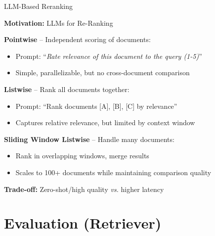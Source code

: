 \documentclass[11pt,compress,t,notes=noshow, xcolor=table]{beamer}
\begin{document}
\begin{frame}{LLM-Based Reranking}

\vfill

\textbf{Motivation:} LLMs for Re-Ranking  

\vspace{1em}

\textbf{Pointwise} -- Independent scoring of documents:
\begin{itemize}
    \item Prompt: ``\textit{Rate relevance of this document to the query (1-5)}''
    \item Simple, parallelizable, but no cross-document comparison
\end{itemize}

\vfill

\textbf{Listwise} -- Rank all documents together:
\begin{itemize}
    \item Prompt: ``Rank documents [A], [B], [C] by relevance''
    \item Captures relative relevance, but limited by context window
\end{itemize}

\vfill

\textbf{Sliding Window Listwise} -- Handle many documents:
\begin{itemize}
    \item Rank in overlapping windows, merge results
    \item Scales to 100+ documents while maintaining comparison quality
\end{itemize}

\vfill

\textbf{Trade-off:} Zero-shot/high quality \textit{vs.} higher latency

\end{frame}


\section{Evaluation (Retriever)}
\end{document}
